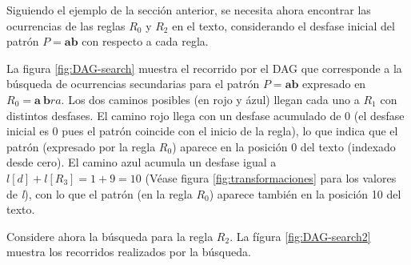 Siguiendo el ejemplo de la sección anterior, se necesita ahora encontrar las ocurrencias de las reglas $R_0$ y $R_2$ en el texto, considerando el desfase inicial del patrón $P = \textbf{ab}$ con respecto a cada regla.

La figura \ref{fig:DAG-search} muestra el recorrido por el DAG que corresponde a la búsqueda de ocurrencias secundarias para el patrón $P = \textbf{ab}$ expresado en $R_0 = \textbf{a}\ \textbf{b}ra$.  Los dos caminos posibles (en rojo y ázul) llegan cada uno a $R_1$ con distintos desfases. El camino rojo llega con un desfase acumulado de 0 (el desfase inicial es 0 pues el patrón coincide con el inicio de la regla), lo que indica que el patrón (expresado por la regla $R_0$) aparece en la posición 0 del texto (indexado desde cero). El camino azul acumula un desfase igual a $l[d] + l[R_3] = 1 + 9 = 10$ (Véase figura \ref{fig:transformaciones} para los valores de \textit{l}), con lo que el patrón (en la regla $R_0$) aparece también en la posición 10 del texto. 

Considere ahora la búsqueda para la regla $R_2$. La fígura \ref{fig:DAG-search2} muestra los recorridos realizados por la búsqueda.

